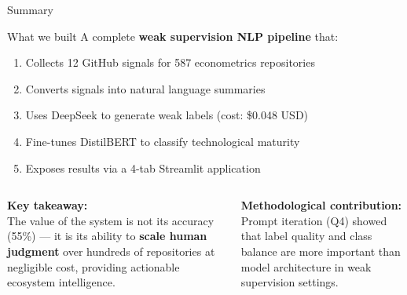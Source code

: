 \begin{frame}{Summary}

  \begin{greenbox}{What we built}
    A complete \textbf{weak supervision NLP pipeline} that:
    \begin{enumerate}
      \item Collects 12 GitHub signals for 587 econometrics repositories
      \item Converts signals into natural language summaries
      \item Uses DeepSeek to generate weak labels (cost: \$0.048 USD)
      \item Fine-tunes DistilBERT to classify technological maturity
      \item Exposes results via a 4-tab Streamlit application
    \end{enumerate}
  \end{greenbox}

  \bigskip
  \begin{columns}
    \textbf{Key takeaway:}\\[0.3em]
    The value of the system is not its accuracy (55\%) —
    it is its ability to \textbf{scale human judgment} over hundreds of
    repositories at negligible cost, providing actionable ecosystem intelligence.

    \textbf{Methodological contribution:}\\[0.3em]
    Prompt iteration (Q4) showed that label quality
    and class balance are more important than model architecture
    in weak supervision settings.
  \end{columns}

\end{frame}
